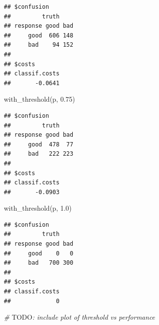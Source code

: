 \documentclass[
]{scrbook}
\newenvironment{Shaded}{\begin{snugshade}}{\end{snugshade}}
\newcommand{\AlertTok}[1]{\textcolor[rgb]{0.94,0.16,0.16}{#1}}
\newcommand{\AttributeTok}[1]{\textcolor[rgb]{0.77,0.63,0.00}{#1}}
\newcommand{\CommentTok}[1]{\textcolor[rgb]{0.56,0.35,0.01}{\textit{#1}}}
\newcommand{\ControlFlowTok}[1]{\textcolor[rgb]{0.13,0.29,0.53}{\textbf{#1}}}
\newcommand{\FloatTok}[1]{\textcolor[rgb]{0.00,0.00,0.81}{#1}}
\newcommand{\FunctionTok}[1]{\textcolor[rgb]{0.00,0.00,0.00}{#1}}
\newcommand{\NormalTok}[1]{#1}
\newcommand{\OtherTok}[1]{\textcolor[rgb]{0.56,0.35,0.01}{#1}}
\newcommand{\SpecialCharTok}[1]{\textcolor[rgb]{0.00,0.00,0.00}{#1}}
\renewenvironment{Shaded} {\begin{snugshade}\small} {\end{snugshade}}
\begin{document}
\begin{Shaded}
\end{Shaded}

\begin{verbatim}
## $confusion
##         truth
## response good bad
##     good  606 148
##     bad    94 152
## 
## $costs
## classif.costs 
##       -0.0641
\end{verbatim}

\begin{Shaded}
\begin{Highlighting}[]
\FunctionTok{with\_threshold}\NormalTok{(p, }\FloatTok{0.75}\NormalTok{)}
\end{Highlighting}
\end{Shaded}

\begin{verbatim}
## $confusion
##         truth
## response good bad
##     good  478  77
##     bad   222 223
## 
## $costs
## classif.costs 
##       -0.0903
\end{verbatim}

\begin{Shaded}
\begin{Highlighting}[]
\FunctionTok{with\_threshold}\NormalTok{(p, }\FloatTok{1.0}\NormalTok{)}
\end{Highlighting}
\end{Shaded}

\begin{verbatim}
## $confusion
##         truth
## response good bad
##     good    0   0
##     bad   700 300
## 
## $costs
## classif.costs 
##             0
\end{verbatim}

\begin{Shaded}
\begin{Highlighting}[]
\CommentTok{\# }\AlertTok{TODO}\CommentTok{: include plot of threshold vs performance}
\end{Highlighting}
\end{Shaded}
\end{document}
